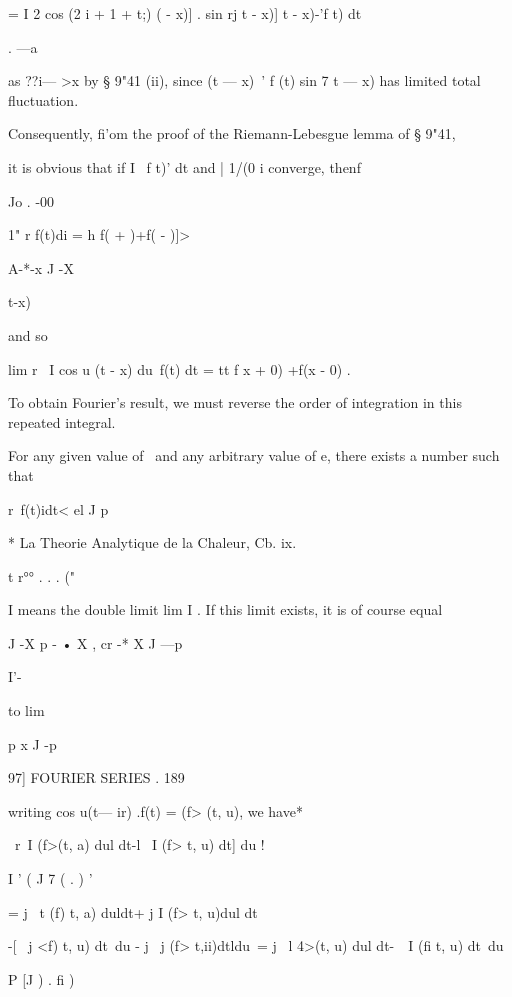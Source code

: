 {= I 2  cos (2 i + 1 + t;) (  - x)] .  sin rj  t - x)]  t - x)-'f t) dt 

. —a 

as ??i— >x by § 9"41 (ii), since (t — x)~'  f (t) sin 7   t — x) has limited total 
fluctuation. 

Consequently, fi'om the proof of the Riemann-Lebesgue lemma of § 9"41, 

it is obvious that if I \ f t)' dt and | 1/(0 i   converge, thenf 

Jo . -00 



1"  r   f(t)di = h  f(  +  )+f( - )]> 



A-*-x J -X 



 t-x) 



and so 



lim r \ I cos u (t - x) du\ f(t) dt =  tt  f x + 0) +f(x - 0) . 

To obtain Fourier's result, we must reverse the order of integration in 
this repeated integral. 

For any given value of \ and any arbitrary value of e, there exists a 
number   such that 

r\ f(t)idt< el  
J p 

* La Theorie Analytique de la Chaleur, Cb. ix. 

t r°° . . . ("  

I means the double limit lim I . If this limit exists, it is of course equal 

J -X p - • X , cr -*  X J —p 

I'- 



to lim 

p x J -p 



97] FOURIER SERIES . 189 

writing cos u(t— ir) .f(t) = (f> (t, u), we have* 

\ r\ I (f>(t, a) dul dt-l \ I (f> t, u) dt] du ! 

I ' (   J 7 ( . ) ' 

= j \ t (f) t, a) duldt+ j   I (f>  t, u)dul dt 

-[ \ j <f)  t, u) dt\ du - j \ j (f> t,ii)dtldu\ 
= j \ l 4>(t, u) dul dt-\ \ I (fi  t, u) dt\ du 

  P [J ) .   fi ) 

}
